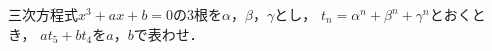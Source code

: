 \documentclass[../../main.tex]{subfiles}
\begin{document}
三次方程式$x^3+ax+b=0$の3根を$\alpha$，$\beta$，$\gamma$とし，
$t_n=\alpha^n+\beta^n+\gamma^n$とおくとき，
$at_5+bt_4$を$a$，$b$で表わせ．
\end{document}
